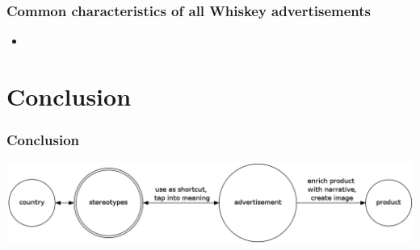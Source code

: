 \documentclass{beamer}
\begin{document}
\begin{frame}
 \frametitle{Common characteristics of all Whiskey advertisements}
 \begin{itemize}
  \item
 \end{itemize}
\end{frame}

\section{Conclusion}

\begin{frame}
 \frametitle{Conclusion}
 \includegraphics[scale=.25]{concepts.png}
\end{frame}

\end{document}
